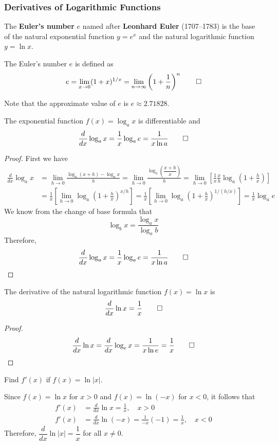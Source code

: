 \subsubsection{Derivatives of Logarithmic Functions}
The \textbf{Euler's number} \(e\) named after \textbf{Leonhard Euler} (1707--1783)
is the base of the natural exponential function \(y=e^x\) and the natural
logarithmic function \(y=\ln x\).
\begin{definition}
    The Euler's number \(e\) is defined as
    \[e=\lim_{x\to 0}(1+x)^{1/x}
    =\lim_{n\to\infty}\left(1+\frac{1}{n}\right)^n\qedhere\]
\end{definition}
Note that the approximate value of \(e\) is \(e\approx2.71828\).
\begin{theorem}
    The exponential function \(f(x)=\log_a x\) is differentiable and
    \[\frac{d}{dx}\log_a x=\frac{1}{x}\log_a e=\frac{1}{x\ln a}\qedhere\]
\end{theorem}
\begin{proof}
    First we have
    \begin{align*}
        \frac{d}{dx}\log_a x &= \lim_{h\to 0}\frac{\log_a(x+h)-\log_a x}{h}
        =\lim_{h\to 0}\frac{\log_a\left(\dfrac{x+h}{x}\right)}{h}
        =\lim_{h\to 0}\left[\frac{1}{x}\frac{x}{h}
        \log_a\left(1+\frac{h}{x}\right)\right] \\
        &= \frac{1}{x}\left[
            \lim_{h\to 0}\log_a\left(1+\frac{h}{x}\right)^{x/h}\right]
        =\frac{1}{x}\left[
            \lim_{h\to 0}\log_a\left(1+\frac{h}{x}\right)^{1/(h/x)}\right]
        =\frac{1}{x}\log_a e
    \end{align*}
    We know from the change of base formula that
    \[\log_b x=\frac{\log_a x}{\log_a b}\]
    Therefore,
    \[\frac{d}{dx}\log_a x=\frac{1}{x}\log_a e=\frac{1}{x\ln a}\qedhere\]
\end{proof}
\begin{theorem}
    The derivative of the natural logarithmic function \(f(x)=\ln x\) is
    \[\frac{d}{dx}\ln x=\frac{1}{x}\qedhere\]
\end{theorem}
\begin{proof}
    \[\frac{d}{dx}\ln x=\frac{d}{dx}\log_e x=\frac{1}{x\ln e}
    =\frac{1}{x}\qedhere\]
\end{proof}
\begin{problem}
    Find \(f'(x)\) if \(f(x)=\ln|x|\).
\end{problem}
\begin{solution}
    Since \(f(x)=\ln x\) for \(x>0\) and \(f(x)=\ln(-x)\) for \(x<0\),
    it follows that
    \begin{align*}
        f'(x) &= \frac{d}{dx}\ln x=\frac{1}{x},\quad x>0 \\
        f'(x) &= \frac{d}{dx}\ln(-x)=\frac{1}{-x}(-1)=\frac{1}{x},\quad x<0
    \end{align*}
    Therefore, \(\dfrac{d}{dx}\ln|x|=\dfrac{1}{x}\) for all \(x\neq 0\).
\end{solution}

